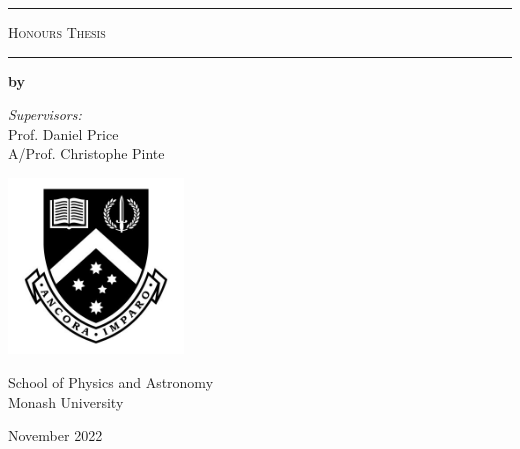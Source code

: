 \begin{titlepage}
    \begin{center}
        \par\noindent\rule{\textwidth}{0.8pt}
       
        \vspace*{1cm}

        \makeatletter
        {\LARGE\textbf{\@title}}

        \vspace{0.5cm}

        \textsc{Honours Thesis}

        \vspace{0.4cm}

        \par\noindent\rule{\textwidth}{0.8pt}
       
        \vspace{0.9cm}

        {\Large\textbf{by \@author}} \\
        \makeatother
        
        \vspace{0.75cm}
        
        {\large\textit{Supervisors:} \\ Prof. Daniel Price \\ A/Prof. Christophe Pinte}

        \vfill
        
        \includegraphics[width=0.35\textwidth]{images/monash_logo.jpg}
        
            
        School of Physics and Astronomy\\
        Monash University\\
        
        \vspace{1.0cm}
        
        {\large November 2022}
            
    \end{center}
\end{titlepage}